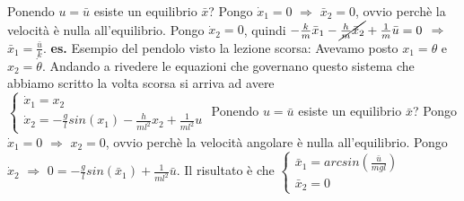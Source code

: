Ponendo $u = \bar{u}$ esiste un equilibrio $\bar{x}$?\newline
Pongo $\dot{x}_1 = 0$ $\Longrightarrow$ $\bar{x}_2 = 0$, ovvio perchè la velocità è nulla all'equilibrio.\newline
Pongo $\dot{x}_2 = 0$, quindi $- \frac{k}{m} \bar{x}_1 - \cancel{ \frac{h}{m}\bar{x}_2} + \frac{1}{m}\bar{u} = 0$ $\Longrightarrow$ $\bar{x}_1 = \frac{\bar{u}}{k}$.\newline
\newline
\textbf{es.} Esempio del pendolo visto la lezione scorsa:\newline
Avevamo posto $x_1 = \theta$ e $x_2 = \dot{\theta}$. Andando a rivedere le equazioni che governano questo sistema che abbiamo scritto la volta scorsa si arriva ad avere $\begin{cases}
    \dot{x}_1 = x_2\\
    \dot{x}_2 = - \frac{g}{l} sin(x_1) - \frac{h}{ml^2} x_2 + \frac{1}{ml^2}u
\end{cases}$
Ponendo $u = \bar{u}$ esiste un equilibrio $\bar{x}$?\newline
Pongo $\dot{x}_1= 0$ $\Longrightarrow$ $x_2 = 0$, ovvio perchè la velocità angolare è nulla all'equilibrio.\newline
Pongo $\dot{x}_2$ $\Longrightarrow$ $0 = - \frac{g}{l}sin(\bar{x}_1) + \frac{1}{ml^2} \bar{u}$.\newline
Il risultato è che $\begin{cases}
    \bar{x}_1 = arcsin(\frac{\bar{u}}{mgl})\\
    \bar{x}_2 = 0
\end{cases}$